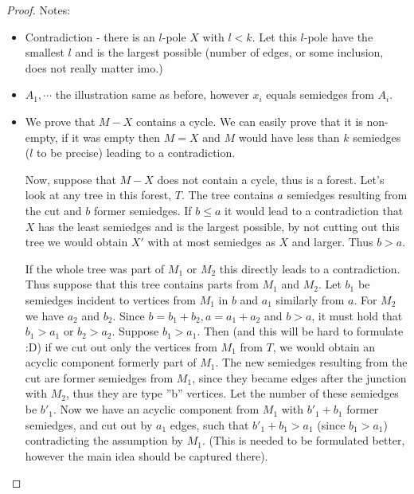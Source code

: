 \documentclass[12pt, twoside]{book}
\begin{document}
\begin{proof}
	Notes:
	\begin{itemize}
		\item Contradiction - there is an $l$-pole $X$ with $l<k$. Let this $l$-pole have the smallest $l$ and is the largest possible (number of edges, or some inclusion, does not really matter imo.)
		\item $A_1,\cdots$ the illustration same as before, however $x_i$ equals semiedges from $A_i$.
		\item We prove that $M-X$ contains a cycle. We can easily prove that it is non-empty, if it was empty then $M=X$ and $M$ would have less than $k$ semiedges ($l$ to be precise) leading to a contradiction.
		
		Now, suppose that $M-X$ does not contain a cycle, thus is a forest. Let's look at any tree in this forest, $T$. The tree contains $a$ semiedges resulting from the cut and $b$ former semiedges. If $b\leq a$ it would lead to a contradiction that $X$ has the least semiedges and is the largest possible, by not cutting out this tree we would obtain $X'$ with at most semiedges as $X$ and larger. Thus $b>a$. 
		
		If the whole tree was part of $M_1$ or $M_2$ this directly leads to a contradiction. Thus suppose that this tree contains parts from $M_1$ and $M_2$. Let $b_1$ be semiedges incident to vertices from $M_1$ in $b$ and $a_1$ similarly from $a$. For $M_2$ we have $a_2$ and $b_2$. Since $b=b_1+b_2, a=a_1+a_2$ and $b>a$, it must hold that $b_1>a_1$ or $b_2>a_2$. Suppose $b_1>a_1$. Then (and this will be hard to formulate :D) if we cut out only the vertices from $M_1$ from $T$, we would obtain an acyclic component formerly part of $M_1$. The new semiedges resulting from the cut are former semiedges from $M_1$, since they became edges after the junction with $M_2$, thus they are type ''b'' vertices. Let the number of these semiedges be $b'_1$. Now we have an acyclic component from $M_1$ with $b'_1+b_1$ former semiedges, and cut out by $a_1$ edges, such that $b'_1+b_1>a_1$ (since $b_1>a_1$) contradicting the assumption by $M_1$. (This is needed to be formulated better, however the main idea should be captured there).
		

\end{itemize}
\end{proof}
\end{document}
